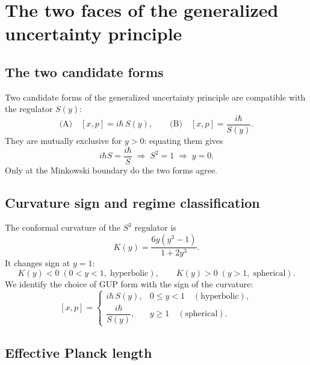 \documentclass[a4paper,1pt,oneside,openany]{book}
\begin{document}
\section{The two faces of the generalized uncertainty principle}

\subsection{The two candidate forms}

Two candidate forms of the generalized uncertainty principle 
are compatible with the regulator $S(y)$:
\begin{equation}
\text{(A)}\quad [x,p]=i\hbar\,S(y),
\qquad
\text{(B)}\quad [x,p]=\frac{i\hbar}{S(y)}.
\label{eq:AB}
\end{equation}
They are mutually exclusive for $y>0$: equating them gives
\begin{equation}
i\hbar S=\frac{i\hbar}{S}
\;\Longrightarrow\;
S^{2}=1
\;\Longrightarrow\;
y=0.
\label{eq:exclusive}
\end{equation}
Only at the Minkowski boundary do the two forms agree.

\subsection{Curvature sign and regime classification}

The conformal curvature of the $S^{3}$ regulator is
\begin{equation}
K(y)=\frac{6y(y^{3}-1)}{1+2y^{3}}.
\label{eq:K}
\end{equation}
It changes sign at $y=1$:
\begin{equation}
K(y)<0\;(0<y<1,\;\text{hyperbolic}),
\qquad
K(y)>0\;(y>1,\;\text{spherical}).
\label{eq:K-sign}
\end{equation}
We identify the choice of GUP form with the sign of the 
curvature:
\begin{equation}
\boxed{
[x,p]=
\begin{cases}
i\hbar\,S(y), & 0\le y<1\quad(\text{hyperbolic}),\\[6pt]
\dfrac{i\hbar}{S(y)}, & y\ge 1\quad(\text{spherical}).
\end{cases}}
\label{eq:piecewise}
\end{equation}

\subsection{Effective Planck length}
\end{document}

